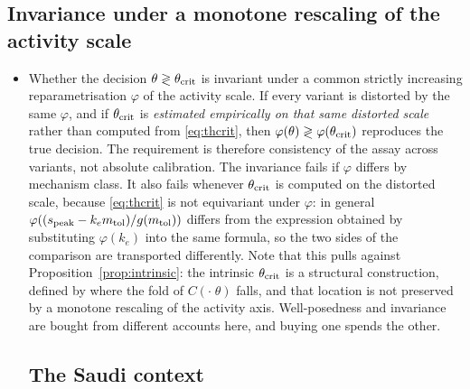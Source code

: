 \subsection{Invariance under a monotone rescaling of the activity scale}

\begin{itemize}[leftmargin=*]
\item Whether the decision $\theta \gtrless \theta_{\mathrm{crit}}$ is invariant under a
      common strictly increasing reparametrisation $\varphi$ of the activity scale. If every variant is
      distorted by the same $\varphi$, and if $\theta_{\mathrm{crit}}$ is \emph{estimated empirically on that
      same distorted scale} rather than computed from \eqref{eq:thcrit}, then
      $\varphi(\theta) \gtrless \varphi(\theta_{\mathrm{crit}})$ reproduces the true decision. The
      requirement is therefore consistency of the assay across variants, not absolute
      calibration. The invariance fails if $\varphi$ differs by mechanism class. It also
      fails whenever $\theta_{\mathrm{crit}}$ is computed on the distorted scale,
      because \eqref{eq:thcrit} is not equivariant under $\varphi$: in general
      $\varphi\!\left((s_{\mathrm{peak}} - k_e m_{\mathrm{tol}})/g(m_{\mathrm{tol}})\right)$ differs from the expression
      obtained by substituting $\varphi(k_e)$ into the same formula, so the two sides of
      the comparison are transported differently. Note that this pulls against
      Proposition~\ref{prop:intrinsic}: the intrinsic $\theta_{\mathrm{crit}}$ is a structural construction,
      defined by where the fold of $C(\cdot\;\theta)$ falls, and that location is not
      preserved by a monotone rescaling of the activity axis. Well-posedness and
      invariance are bought from different accounts here, and buying one spends the
      other.


\subsection{The Saudi context}


\end{itemize}
